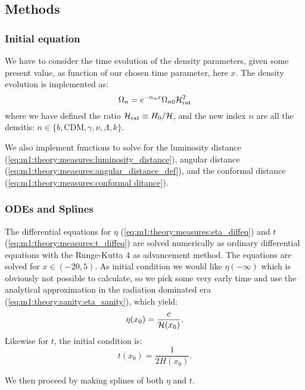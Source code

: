 \subsection{Methods}\label{sec:m1:methods}

\subsubsection{Initial equation}
    We have to consider the time evolution of the density parameters, given some present value, as function of our chosen time parameter, here $x$. The density evolution is implemented as:
    \begin{equation}\label{eq:m1:methods:initial:density_evolution}
        \Omega_n = e^{-\alpha_nx}\Omega_{n0}\mathcal{H}_\mathrm{rat}^2
    \end{equation}
    where we have defined the ratio $\mathcal{H}_\mathrm{rat} \equiv H_0/\mathcal{H}$, and the new index $n$ are all the densitis: $n\in\{b, \mathrm{CDM}, \gamma, \nu, \Lambda, k\}$.

    We also implement functions to solve for the luminosity distance (\cref{eq:m1:theory:measures:luminosity_distance}), angular distance (\cref{eq:m1:theory:measures:angular_distance_def}), and the conformal distance (\cref{eq:m1:theory:measures:conformal ditance}).


\subsubsection{ODEs and Splines}
    The differential equations for $\eta$ (\cref{eq:m1:theory:measures:eta_diffeq}) and $t$ (\cref{eq:m1:theory:measures:t_diffeq}) are solved numerically as ordinary differential equations with the Runge-Kutta 4 as advancement method. The equations are solved for $x\in(-20,5)$. As initial condition we would like $\eta(-\infty)$ which is obviously not possible to calculate, so we pick some very early time and use the analytical approximation in the radiation dominated era (\cref{eq:m1:theory:sanity:eta_sanity}), which yield:
    \begin{equation}\label{eq:m1:methods:odes:eta_initial}
        \eta(x_0) = \frac{c}{\mathcal{H}(x_0)}.
    \end{equation}
    Likewise for $t$, the initial condition is:
    \begin{equation}\label{eq:m1:methods:odes:t_initial}
        t(x_0) = \frac{1}{2H(x_0)}.
    \end{equation}
    
    

    We then proceed by making splines of both $\eta$ and $t$. 